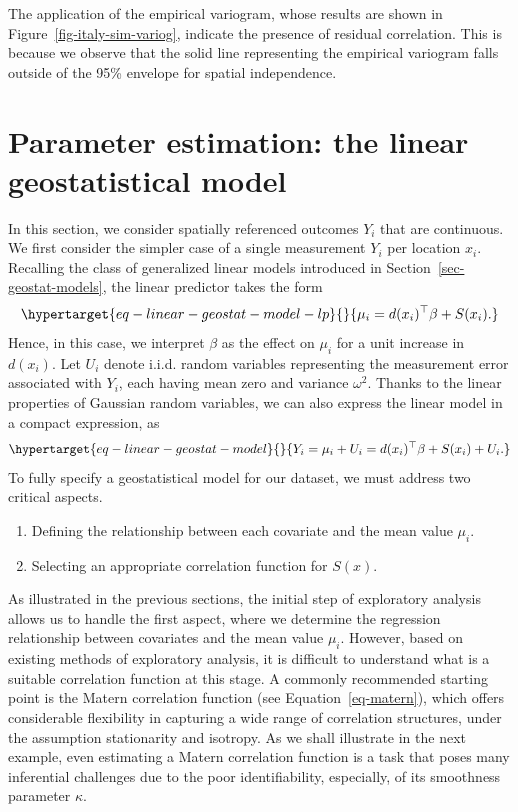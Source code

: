 \documentclass[
  letterpaper,
]{krantz}
\providecommand{\tightlist}{%
  \setlength{\itemsep}{0pt}\setlength{\parskip}{0pt}}\usepackage{longtable,booktabs,array}
\begin{document}
The application of the empirical variogram, whose results are shown in
Figure~\ref{fig-italy-sim-variog}, indicate the presence of residual
correlation. This is because we observe that the solid line representing
the empirical variogram falls outside of the 95\% envelope for spatial
independence.

\hypertarget{sec-linear-model}{%
\section{Parameter estimation: the linear geostatistical
model}\label{sec-linear-model}}

In this section, we consider spatially referenced outcomes \(Y_i\) that
are continuous. We first consider the simpler case of a single
measurement \(Y_i\) per location \(x_i\). Recalling the class of
generalized linear models introduced in
Section~\ref{sec-geostat-models}, the linear predictor takes the form
\begin{equation}\protect\hypertarget{eq-linear-geostat-model-lp}{}{
\mu_{i} = d(x_i)^\top \beta + S(x_i).
}\label{eq-linear-geostat-model-lp}\end{equation} Hence, in this case,
we interpret \(\beta\) as the effect on \(\mu_i\) for a unit increase in
\(d(x_i)\). Let \(U_i\) denote i.i.d. random variables representing the
measurement error associated with \(Y_i\), each having mean zero and
variance \(\omega^2\). Thanks to the linear properties of Gaussian
random variables, we can also express the linear model in a compact
expression, as
\begin{equation}\protect\hypertarget{eq-linear-geostat-model}{}{
Y_i = \mu_i + U_i = d(x_i)^\top \beta + S(x_i) + U_i.
}\label{eq-linear-geostat-model}\end{equation} To fully specify a
geostatistical model for our dataset, we must address two critical
aspects.

\begin{enumerate}
\def\labelenumi{\arabic{enumi}.}
\tightlist
\item
  Defining the relationship between each covariate and the mean value
  \(\mu_i\).
\item
  Selecting an appropriate correlation function for \(S(x)\).
\end{enumerate}

As illustrated in the previous sections, the initial step of exploratory
analysis allows us to handle the first aspect, where we determine the
regression relationship between covariates and the mean value \(\mu_i\).
However, based on existing methods of exploratory analysis, it is
difficult to understand what is a suitable correlation function at this
stage. A commonly recommended starting point is the Matern correlation
function (see Equation~\ref{eq-matern}), which offers considerable
flexibility in capturing a wide range of correlation structures, under
the assumption stationarity and isotropy. As we shall illustrate in the
next example, even estimating a Matern correlation function is a task
that poses many inferential challenges due to the poor identifiability,
especially, of its smoothness parameter \(\kappa\).
\end{document}

